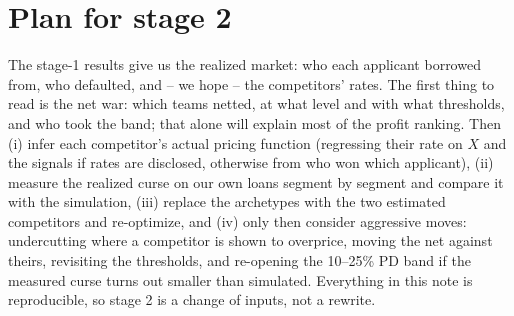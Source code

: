 \documentclass[11pt,a4paper]{article}
\begin{document}
\section{Plan for stage 2}
The stage-1 results give us the realized market: who each applicant borrowed from, who defaulted, and -- we hope
-- the competitors' rates. The first thing to read is the net war: which teams netted, at what level and with
what thresholds, and who took the band; that alone will explain most of the profit ranking. Then (i) infer each
competitor's actual pricing function (regressing their rate on $X$ and the signals if rates are disclosed,
otherwise from who won which applicant), (ii) measure the realized curse on our own loans segment by segment and
compare it with the simulation, (iii) replace the archetypes with the two estimated competitors and re-optimize,
and (iv) only then consider aggressive moves: undercutting where a competitor is shown to overprice, moving the
net against theirs, revisiting the thresholds, and re-opening the 10--25\% PD band if the measured curse turns
out smaller than simulated. Everything in this note is reproducible, so stage 2 is a change of inputs, not a
rewrite.
\end{document}
